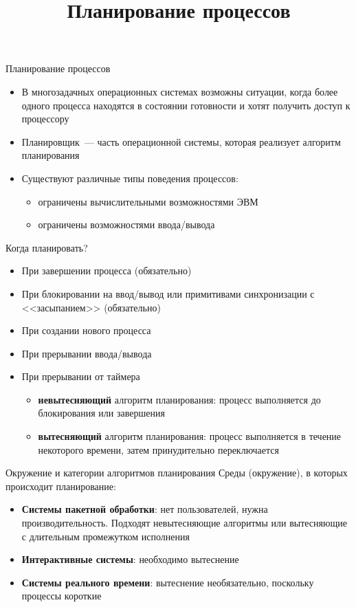 \documentclass[aspectratio=169,14pt]{beamer}
\title{Планирование процессов}
\begin{document}
\begin{frame}{Планирование процессов}
    \begin{itemize}
        \item В многозадачных операционных системах возможны ситуации, когда
        более одного процесса находятся в состоянии готовности и хотят
        получить доступ к процессору
        \item Планировщик~--- часть операционной системы, которая реализует
        алгоритм планирования
        \item Существуют различные типы поведения процессов:
        \begin{itemize}
            \item ограничены вычислительными возможностями ЭВМ
            \item ограничены возможностями ввода/вывода
        \end{itemize}
    \end{itemize}
\end{frame}

\begin{frame}{Когда планировать?}
    \begin{itemize}
        \item При завершении процесса (обязательно)
        \item При блокировании на ввод/вывод или примитивами синхронизации
        с <<засыпанием>> (обязательно)
        \item При создании нового процесса
        \item При прерывании ввода/вывода
        \item При прерывании от таймера
        \begin{itemize}
            \item \textbf{невытесняющий} алгоритм планирования: процесс
            выполняется до блокирования или завершения
            \item \textbf{вытесняющий} алгоритм планирования: процесс
            выполняется в течение некоторого времени, затем принудительно
            переключается
        \end{itemize}
    \end{itemize}
\end{frame}

\begin{frame}{Окружение и категории алгоритмов планирования}
    Среды (окружение), в которых происходит планирование:
    \begin{itemize}
        \item \textbf{Системы пакетной обработки}: нет пользователей, нужна
        производительность. Подходят невытесняющие алгоритмы или вытесняющие
        с длительным промежутком исполнения
        \item \textbf{Интерактивные системы}: необходимо вытеснение
        \item \textbf{Системы реального времени}: вытеснение необязательно, поскольку
        процессы короткие
    \end{itemize}
\end{frame}
\end{document}
